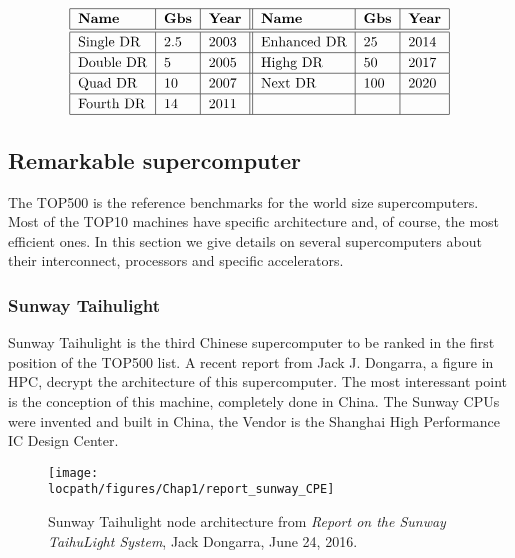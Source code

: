 \begin{table}
\begin{center}
\[\arraycolsep=0.pt\def\arraystretch{1.2}
\begin{tabular}{| l | l | l || l | l | l | }
\hline
\textbf{Name} & \textbf{Gbs} & \textbf{Year} & \textbf{Name} & \textbf{Gbs} & \textbf{Year} \\
\hline
\hline
Single DR & 2.5 & 2003 & Enhanced DR & 25 & 2014 \\
\hline
Double DR & 5 & 2005 & Highg DR & 50 & 2017 \\
\hline
Quad DR & 10 & 2007 & Next DR & 100 & 2020 \\
\hline
Fourth DR & 14 & 2011 & & &  \\
\hline
\end{tabular}
\]
\caption{InfiniBand technologies}
\label{fig:1_HPC:infiniband}
\end{center}
\end{table}

\subsection{Remarkable supercomputer}
The TOP500 is the reference benchmarks for the world size supercomputers. 
Most of the TOP10 machines have specific architecture and, of course, the most efficient ones. 
In this section we give details on several supercomputers about their interconnect, processors and specific accelerators. 

\subsubsection{Sunway Taihulight}

Sunway Taihulight is the third Chinese supercomputer to be ranked in the first position of the TOP500 list. 
A recent report from Jack J. Dongarra, a figure in HPC, decrypt the architecture of this supercomputer\cite{dongarra2016report}. 
The most interessant point is the conception of this machine, completely done in China. 
The Sunway CPUs were invented and built in China, the Vendor is the Shanghai High Performance IC Design Center. 

\begin{figure}
\centering
\texttt{[image: \\locpath/figures/Chap1/report\_sunway\_CPE]}
\caption{Sunway Taihulight node architecture from \textit{Report on the Sunway TaihuLight System}, Jack Dongarra, June 24, 2016.}
\label{fig:chap1_report_sunway_CPE}
\end{figure}

